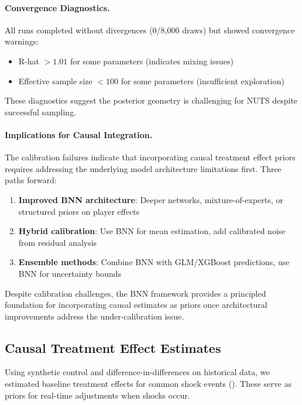 \paragraph{Convergence Diagnostics.}
All runs completed without divergences (0/8,000 draws) but showed convergence warnings:
\begin{itemize}
  \item R-hat $> 1.01$ for some parameters (indicates mixing issues)
  \item Effective sample size $< 100$ for some parameters (insufficient exploration)
\end{itemize}
These diagnostics suggest the posterior geometry is challenging for NUTS despite successful sampling.

\paragraph{Implications for Causal Integration.}
The calibration failures indicate that incorporating causal treatment effect priors requires addressing the underlying model architecture limitations first. Three paths forward:

\begin{enumerate}
  \item \textbf{Improved BNN architecture}: Deeper networks, mixture-of-experts, or structured priors on player effects
  \item \textbf{Hybrid calibration}: Use BNN for mean estimation, add calibrated noise from residual analysis
  \item \textbf{Ensemble methods}: Combine BNN with GLM/XGBoost predictions, use BNN for uncertainty bounds
\end{enumerate}

Despite calibration challenges, the BNN framework provides a principled foundation for incorporating causal estimates as priors once architectural improvements address the under-calibration issue.

\subsection{Causal Treatment Effect Estimates}

Using synthetic control and difference-in-differences on historical data, we estimated baseline treatment effects for common shock events (). These serve as priors for real-time adjustments when shocks occur.



